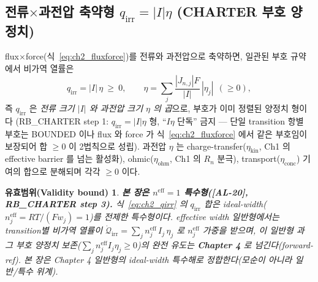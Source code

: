 \documentclass[11pt,a4paper]{article}
\newtheorem*{boundbox}{유효범위(Validity bound)}
\newcommand{\eff}{\mathrm{eff}}
\newcommand{\irr}{\mathrm{irr}}
\newcommand{\kin}{\mathrm{kin}}
\newcommand{\ohm}{\mathrm{ohm}}
\newcommand{\conc}{\mathrm{conc}}
\newcommand{\AL}[1]{\textsf{[AL-#1]}}
\begin{document}
\subsection{전류$\times$과전압 축약형 $q_\irr=|I|\eta$ (CHARTER 부호 양정치)}\label{sec:ch2_Ieta}
flux$\times$force(식~\eqref{eq:ch2_fluxforce})를 전류와 과전압으로 축약하면, 일관된 부호 규약에서 비가역 열률은
\begin{equation}
\boxed{\;q_{\irr}=|I|\,\eta\ \ge\ 0,\qquad \eta=\sum_j \frac{|J_{n,j}|F}{|I|}\,|\eta_j|\ \ (\ge0),\;}
\label{eq:ch2_qirr}
\end{equation}
즉 $q_\irr$ 은 \emph{전류 크기 $|I|$ 와 과전압 크기 $\eta$ 의 곱}으로, 부호가 이미 정렬된 양정치 형이다
(RB\_CHARTER step 1: $q_\irr=|I|\eta$ 형, ``$I\eta$ 단독'' 금지 — 단일 transition 항별 부호는 BOUNDED 이나
flux 와 force 가 식~\eqref{eq:ch2_fluxforce} 에서 같은 부호임이 보장되어 합 $\ge0$ 이 2법칙으로 성립). 과전압
$\eta$ 는 charge-transfer($\eta_\kin$, Ch1 의 effective barrier 를 넘는 활성화), ohmic($\eta_\ohm$, Ch1 의
$R_n$ 분극), transport($\eta_\conc$) 기여의 합으로 분해되며 각각 $\ge0$ 이다.
\begin{boundbox}
\textbf{본 장은 $n^{\eff}=1$ 특수형(\AL{20}, RB\_CHARTER step 3).} 식~\eqref{eq:ch2_qirr} 의 $q_\irr$ 합은
ideal-width($n_j^{\eff}=RT/(Fw_j)=1$)를 전제한 특수형이다. effective width 일반형에서는 transition별 비가역
열률이 $\dot{\mathcal Q}_{\irr}=\sum_j n_j^{\eff}\,I_j\,\eta_j$ 로 $n_j^{\eff}$ 가중을 받으며, 이 \emph{일반형}
과 그 부호 양정치 보존($\sum_j n_j^{\eff}I_j\eta_j\ge0$)의 완전 유도는 \textbf{Chapter 4} 로 넘긴다(forward-ref).
본 장은 Chapter 4 일반형의 ideal-width 특수해로 정합한다(모순이 아니라 일반/특수 위계).
\end{boundbox}
\end{document}

